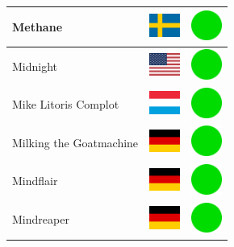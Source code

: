 \documentclass[12pt, a4paper, twoside]{report}
\begin{document}
\begin{center}
\begin{longtable}{|p{5cm}|p{2cm}|p{2cm}|}
 Methane                                                    & \includegraphics[width=1cm]{4x3/se} &   \includegraphics[width=1cm]{likes/y} \\ \hline
 Midnight                                                   & \includegraphics[width=1cm]{4x3/us} &   \includegraphics[width=1cm]{likes/y} \\ \hline
 Mike Litoris Complot                                       & \includegraphics[width=1cm]{4x3/lu} &   \includegraphics[width=1cm]{likes/y} \\ \hline
 Milking the Goatmachine                                    & \includegraphics[width=1cm]{4x3/de} &   \includegraphics[width=1cm]{likes/y} \\ \hline
 Mindflair                                                  & \includegraphics[width=1cm]{4x3/de} &   \includegraphics[width=1cm]{likes/y} \\ \hline
 Mindreaper                                                 & \includegraphics[width=1cm]{4x3/de} &   \includegraphics[width=1cm]{likes/y} \\ \hline

\end{longtable}
\end{center}
\end{document}
